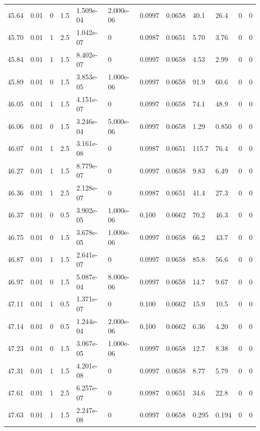 \documentclass[preview]{standalone}
\begin{document}
{{{{{{{{{{\begin{tabular}{L{1.2cm}C{1.2cm} C{0.3cm}C{0.5cm} C{1.4cm}C{1.4cm} C{1.4cm}C{1.4cm} C{1.6cm}C{1.6cm} C{1.6cm}C{1.6cm}}
  45.64  &  0.01  & 0     & 1.5 &  1.509e-04  & 2.000e-06  &  0.0997&   0.0658& 40.1 & 26.4   &  0 & 0  \\ 
  45.70  &  0.01  & 1     & 2.5 &  1.042e-07  & 0  &  0.0987&   0.0651& 5.70 & 3.76   &  0 & 0  \\ 
  45.84  &  0.01  & 1     & 1.5 &  8.402e-07  & 0  &  0.0997&   0.0658& 4.53 & 2.99   &  0 & 0  \\ 
  45.89  &  0.01  & 0     & 1.5 &  3.853e-05  & 1.000e-06  &  0.0997&   0.0658& 91.9 & 60.6   &  0 & 0  \\ 
  46.05  &  0.01  & 1     & 1.5 &  4.151e-07  & 0  &  0.0997&   0.0658& 74.1 & 48.9   &  0 & 0  \\ 
  46.06  &  0.01  & 0     & 1.5 &  3.246e-04  & 5.000e-06  &  0.0997&   0.0658& 1.29 & 0.850   &  0 & 0  \\ 
  46.07  &  0.01  & 1     & 2.5 &  3.161e-08  & 0  &  0.0987&   0.0651& 115.7 & 76.4   &  0 & 0  \\ 
  46.27  &  0.01  & 1     & 1.5 &  8.779e-07  & 0  &  0.0997&   0.0658& 9.83 & 6.49   &  0 & 0  \\ 
  46.36  &  0.01  & 1     & 2.5 &  2.128e-07  & 0  &  0.0987&   0.0651& 41.4 & 27.3   &  0 & 0  \\ 
  46.37  &  0.01  & 0     & 0.5 &  3.902e-05  & 1.000e-06  &  0.100&   0.0662& 70.2 & 46.3   &  0 & 0  \\ 
  46.75  &  0.01  & 0     & 1.5 &  3.678e-05  & 1.000e-06  &  0.0997&   0.0658& 66.2 & 43.7   &  0 & 0  \\ 
  46.87  &  0.01  & 1     & 1.5 &  2.641e-07  & 0  &  0.0997&   0.0658& 85.8 & 56.6   &  0 & 0  \\ 
  46.97  &  0.01  & 0     & 1.5 &  5.087e-04  & 8.000e-06  &  0.0997&   0.0658& 14.7 & 9.67   &  0 & 0  \\ 
  47.11  &  0.01  & 1     & 0.5 &  1.371e-07  & 0  &  0.100&   0.0662& 15.9 & 10.5   &  0 & 0  \\ 
  47.14  &  0.01  & 0     & 0.5 &  1.244e-04  & 2.000e-06  &  0.100&   0.0662& 6.36 & 4.20   &  0 & 0  \\ 
  47.23  &  0.01  & 0     & 1.5 &  3.067e-05  & 1.000e-06  &  0.0997&   0.0658& 12.7 & 8.38   &  0 & 0  \\ 
  47.31  &  0.01  & 1     & 1.5 &  4.201e-08  & 0  &  0.0997&   0.0658& 8.77 & 5.79   &  0 & 0  \\ 
  47.61  &  0.01  & 1     & 2.5 &  6.257e-07  & 0  &  0.0987&   0.0651& 34.6 & 22.8   &  0 & 0  \\ 
  47.63  &  0.01  & 1     & 1.5 &  2.247e-08  & 0  &  0.0997&   0.0658& 0.295 & 0.194   &  0 & 0  \\ 

\end{tabular}}}}}}}}}}}
\end{document}
